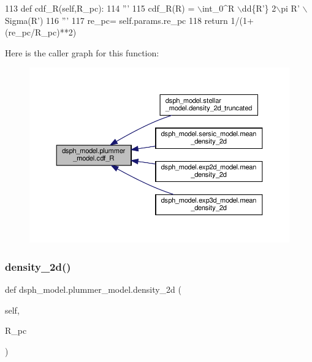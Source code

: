 \begin{DoxyCode}
113     \textcolor{keyword}{def }cdf\_R(self,R\_pc):
114         \textcolor{stringliteral}{'''}
115 \textcolor{stringliteral}{        cdf\_R(R) = \(\backslash\)int\_0^R \(\backslash\)dd\{R'\} 2\(\backslash\)pi R' \(\backslash\)Sigma(R')}
116 \textcolor{stringliteral}{        '''}
117         re\_pc= self.params.re\_pc
118         \textcolor{keywordflow}{return} 1/(1+(re\_pc/R\_pc)**2)
\end{DoxyCode}
Here is the caller graph for this function\+:\nopagebreak
\begin{figure}[H]
\begin{center}
\leavevmode
\includegraphics[width=350pt]{d4/d46/classdsph__model_1_1plummer__model_a15987917b4f24a022349526405c49a81_icgraph}
\end{center}
\end{figure}
\mbox{\label{classdsph__model_1_1plummer__model_af63912fdaa4af84219a46210ffd8ab92}} 
\subsubsection{\texorpdfstring{density\+\_\+2d()}{density\_2d()}}
{\footnotesize\ttfamily def dsph\+\_\+model.\+plummer\+\_\+model.\+density\+\_\+2d (\begin{DoxyParamCaption}\item[{}]{self,  }\item[{}]{R\+\_\+pc }\end{DoxyParamCaption})}



